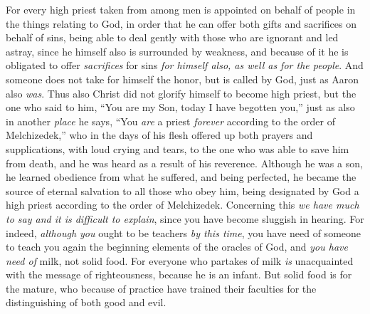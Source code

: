 \begin{biblechapter} %
 For every high priest taken from among men is appointed on behalf of people in the things relating to God, in order that he can offer both gifts and sacrifices on behalf of sins,
\verse being able to deal gently with those who are ignorant and led astray, since he himself also is surrounded by weakness,
\verse and because of it he is obligated to offer \textit{sacrifices} for sins \textit{for himself also, as well as for the people}.
\verse And someone does not take for himself the honor, but is called by God, just as Aaron also \textit{was}.
\verse Thus also Christ did not glorify himself to become high priest, but the one who said to him, “You are my Son, today I have begotten you,”
\verse just as also in another \textit{place} he says, “You \textit{are} a priest \textit{forever} according to the order of Melchizedek,”
\verse who in the days of his flesh offered up both prayers and supplications, with loud crying and tears, to the one who was able to save him from death, and he was heard as a result of his reverence.
\verse Although he was a son, he learned obedience from what he suffered,
\verse and being perfected, he became the source of eternal salvation to all those who obey him,
\verse being designated by God a high priest according to the order of Melchizedek.
 Concerning this \textit{we have much to say and it is difficult to explain}, since you have become sluggish in hearing.
\verse For indeed, \textit{although you} ought to be teachers \textit{by this time}, you have need of someone to teach you again the beginning elements of the oracles of God, and \textit{you have need of} milk, not solid food.
\verse For everyone who partakes of milk \textit{is} unacquainted with the message of righteousness, because he is an infant.
\verse But solid food is for the mature, who because of practice have trained their faculties for the distinguishing of both good and evil.
\end{biblechapter}

